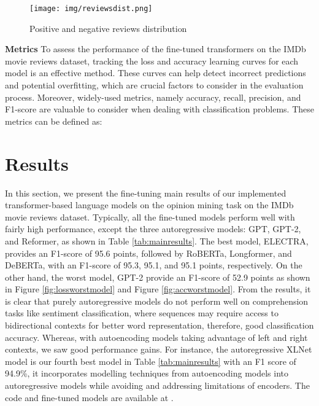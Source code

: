 \documentclass{article}
\begin{document}
\begin{figure}[!ht]
\centering
  \texttt{[image: img/reviewsdist.png]}
      \vspace{.3em}
 \caption{Positive and negative reviews distribution}
  \label{fig:reviewsdist}
\end{figure}


\textbf{Metrics} To assess the performance of the fine-tuned transformers on the IMDb movie reviews dataset, tracking the loss and accuracy learning curves for each model is an effective method. These curves can help detect incorrect predictions and potential overfitting, which are crucial factors to consider in the evaluation process. Moreover, widely-used metrics, namely accuracy, recall, precision, and F1-score are valuable to consider when dealing with classification problems. These metrics can be defined as:



\section{Results}
In this section, we present the fine-tuning main results of our implemented transformer-based language models on the opinion mining task on the IMDb movie reviews dataset. Typically, all the fine-tuned models perform well with fairly high performance, except the three autoregressive models: GPT, GPT-2, and Reformer, as shown in Table \ref{tab:mainresults}. The best model, ELECTRA, provides an F1-score of 95.6 points, followed by RoBERTa, Longformer, and DeBERTa, with an F1-score of 95.3, 95.1, and 95.1 points, respectively. On the other hand, the worst model, GPT-2 provide an F1-score of 52.9 points as shown in Figure \ref{fig:lossworstmodel} and \linebreak Figure  \ref{fig:accworstmodel}. From the results, it is clear that purely autoregressive models do not perform well on comprehension tasks like sentiment classification, where sequences may require access to bidirectional contexts for better word representation, therefore, good classification accuracy. Whereas, with autoencoding models taking advantage of left and right contexts, we saw good performance gains. For instance, the autoregressive XLNet model is our fourth best model in Table \ref{tab:mainresults} with an F1 score of 94.9\%, it incorporates modelling techniques from autoencoding models into autoregressive models while avoiding and addressing limitations of encoders. The code and fine-tuned models are available at \cite{opinion2023zekaoui}.
\end{document}
